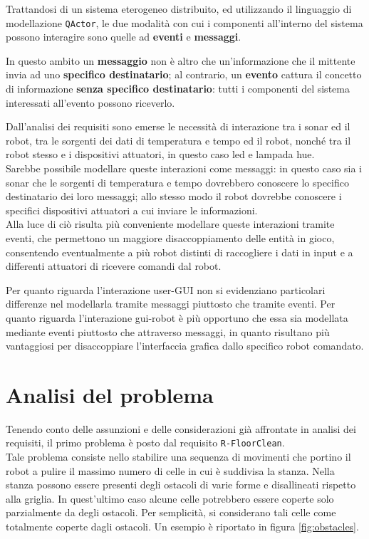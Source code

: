 \documentclass{llncs}
\newcommand{\action}[1]{\texttt{#1}\xspace}
\newcommand{\code}[1]{{\color{blue}\small{\texttt{#1}}}}
\newcommand{\labelsec}[1]{\label{sec:#1}}
\begin{document}
Trattandosi di un sistema eterogeneo distribuito, ed utilizzando il linguaggio di modellazione \action{QActor}, le due modalità con cui i componenti all'interno del sistema possono interagire sono quelle ad \textbf{eventi} e \textbf{messaggi}. 

In questo ambito un \textbf{messaggio} non è altro che un'informazione che il mittente invia ad uno \textbf{specifico destinatario}; al contrario, un \textbf{evento} cattura il concetto di informazione \textbf{senza specifico destinatario}: tutti i componenti del sistema interessati all'evento possono riceverlo. 

Dall'analisi dei requisiti sono emerse le necessità di interazione tra i sonar ed il robot, tra le sorgenti dei dati di temperatura e tempo ed il robot, nonché tra il robot stesso e i dispositivi attuatori, in questo caso led e lampada hue. \\
Sarebbe possibile modellare queste interazioni come messaggi: in questo caso sia i sonar che le sorgenti di temperatura e tempo dovrebbero conoscere lo specifico destinatario dei loro messaggi; allo stesso modo il robot dovrebbe conoscere i specifici dispositivi attuatori a cui inviare le informazioni. \\
Alla luce di ciò risulta più conveniente modellare queste interazioni tramite eventi, che permettono un maggiore disaccoppiamento delle entità in gioco, consentendo eventualmente a più robot distinti di raccogliere i dati in input e a differenti attuatori di ricevere comandi dal robot. 

Per quanto riguarda l'interazione user-GUI non si evidenziano particolari differenze nel modellarla tramite messaggi piuttosto che tramite eventi. 
Per quanto riguarda l'interazione gui-robot è più opportuno che essa sia modellata mediante eventi piuttosto che attraverso messaggi, in quanto risultano più vantaggiosi per disaccoppiare l'interfaccia grafica dallo specifico robot comandato. 


\section{Analisi del problema}
\labelsec{ProblemAnalysis}

Tenendo conto delle assunzioni e delle considerazioni già affrontate in analisi dei requisiti, il primo problema è posto dal requisito \code{R-FloorClean}. \\ Tale problema consiste nello stabilire una sequenza di movimenti che portino il robot a pulire il massimo numero di celle in cui è suddivisa la stanza. Nella stanza possono essere presenti degli ostacoli di varie forme e disallineati rispetto alla griglia. In quest'ultimo caso alcune celle potrebbero essere coperte solo parzialmente da degli ostacoli. Per semplicità, si considerano tali celle come totalmente coperte dagli ostacoli. Un esempio è riportato in figura \ref{fig:obstacles}.
\end{document}
